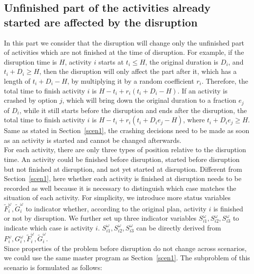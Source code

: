 \documentclass[11pt]{article}
\begin{document}
	\subsection{Unfinished part of the activities already started are affected by the disruption} \label{scen2}
		In this part we consider that the disruption will change only the unfinished part of activities which are not finished at the time of disruption. For example, if the disruption time is \(H\), activity \(i\) starts at \(t_i \leq H\), the original duration is \(D_i\), and \(t_i + D_i \geq H\), then the disruption will only affect the part after it, which has a length of \(t_i + D_i - H\), by multiplying it by a random coefficient \(r_i\). Therefore, the total time to finish activity \(i\) is \(H - t_i + r_i(t_i + D_i - H)\). If an activity is crashed by option \(j\), which will bring down the original duration to a fraction \(e_j\) of \(D_i\), while it still starts before the disruption and ends after the disruption, the total time to finish activity \(i\) is \(H - t_i + r_i(t_i + D_ie_j - H)\), where \(t_i + D_ie_j \geq H\). Same as stated in Section~\ref{scen1}, the crashing decisions need to be made as soon as an activity is started and cannot be changed afterwards.\\
		\newline For each activity, there are only three types of position relative to the disruption time. An activity could be finished before disruption, started before disruption but not finished at disruption, and not yet started at disruption. Different from Section~\ref{scen1}, here whether each activity is finished at disruption needs to be recorded as well because it is necessary to distinguish which case matches the situation of each activity. For simplicity, we introduce more status variables \(\tilde{F}_i^\omega, \tilde{G}_i^\omega\) to indicator whether, according to the original plan, activity \(i\) is finished or not by disruption. We further set up three indicator variables \(S_{i1}^\omega, S_{i2}^\omega, S_{i3}^\omega\) to indicate which case is activity \(i\). \(S_{i1}^\omega, S_{i2}^\omega, S_{i3}^\omega\) can be directly derived from \(F_i^\omega, G_i^\omega, \tilde{F}_i^\omega, \tilde{G}_i^\omega\). \\
		\newline Since properties of the problem before disruption do not change across scenarios, we could use the same master program as Section~\ref{scen1}. The subproblem of this scenario is formulated as follows:
\end{document}
